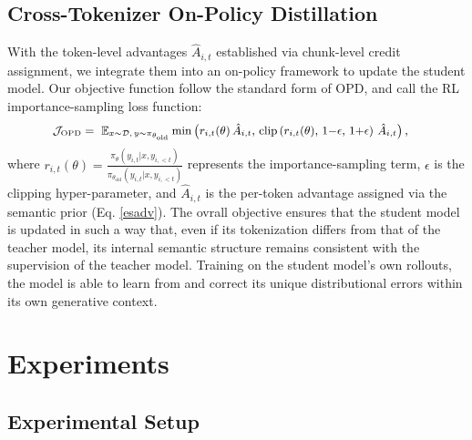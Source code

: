 \documentclass{article}
\theoremstyle{plain}
\theoremstyle{definition}
\theoremstyle{remark}
\begin{document}
\subsection{Cross-Tokenizer On-Policy Distillation}

With the token-level advantages $\hat{A}_{i,t}$ established via chunk-level credit assignment, we integrate them into an on-policy framework to update the student model. Our objective function follow the standard form of OPD, and call the RL importance-sampling loss function:
\begin{equation}
\small
\begin{aligned}
\mathcal{J}_\text{OPD}& =\ 
\mathbb{E}_{x \sim \mathcal{D},\, y \sim \pi_{\theta_{\mathrm{old}}}} 
  \min\left(
    r_{i,t}(\theta)\, \hat{A}_{i,t},\, 
    \mathrm{clip}\left(
      r_{i,t}(\theta),\, 1{-}\epsilon,\, 1{+}\epsilon
    \right)\, \hat{A}_{i,t}
  \right),
\end{aligned}
\end{equation}
where $r_{i,t}(\theta) = \frac{\pi_\theta(y_{i,t}|x, y_{i,<t})}{\pi_{\theta_\mathrm{old}}(y_{i,t}|x, y_{i,<t})}$ represents the importance-sampling term, $\epsilon$ is the clipping hyper-parameter, and  $\hat{A}_{i,t}$ is the per-token advantage assigned via the semantic prior (Eq. \ref{esadv}). The ovrall objective ensures that the student model is updated in such a way that, even if its tokenization differs from that of the teacher model, its internal semantic structure remains consistent with the supervision of the teacher model. Training on the student model's own rollouts, the model is able to learn from and correct its unique distributional errors within its own generative context.



\section{Experiments}
\label{sec:experiments}


\subsection{Experimental Setup}
\label{sec:exp_setup}
\end{document}

